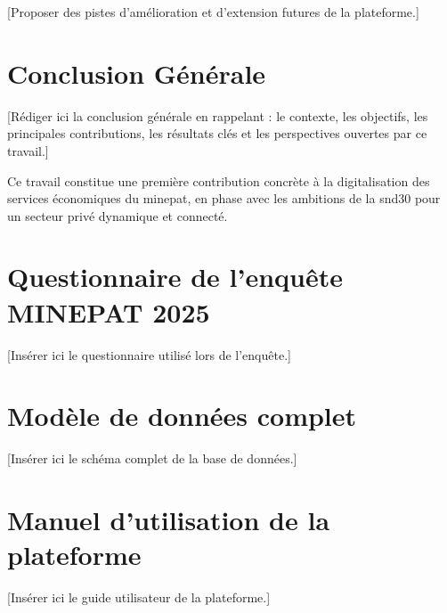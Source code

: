 \documentclass[12pt, a4paper, oneside]{report}
\begin{document}
[Proposer des pistes d'amélioration et d'extension futures de la plateforme.]

\chapter*{Conclusion Générale}

[Rédiger ici la conclusion générale en rappelant : le contexte, les objectifs, les principales contributions, les résultats clés et les perspectives ouvertes par ce travail.]

\medskip

Ce travail constitue une première contribution concrète à la digitalisation des services économiques du \gls{minepat}, en phase avec les ambitions de la \gls{snd30} pour un secteur privé dynamique et connecté.

\printbibliography[heading=bibintoc,
                    title={Références bibliographiques}]

\appendix
\chapter{Questionnaire de l'enquête MINEPAT 2025}
\label{ann:questionnaire}

[Insérer ici le questionnaire utilisé lors de l'enquête.]

\chapter{Modèle de données complet}
\label{ann:modele}

[Insérer ici le schéma complet de la base de données.]

\chapter{Manuel d'utilisation de la plateforme}
\label{ann:manuel}

[Insérer ici le guide utilisateur de la plateforme.]
\end{document}
